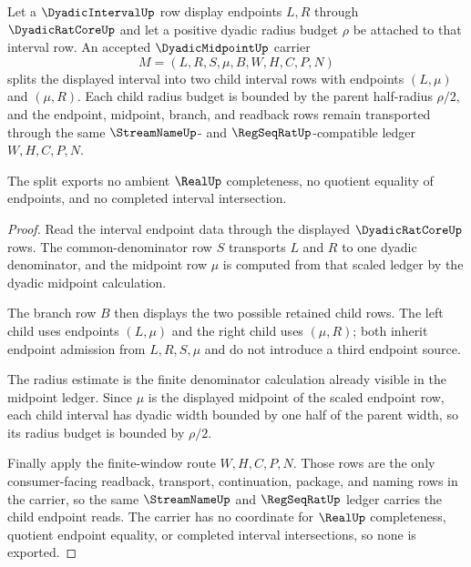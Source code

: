 \begin{theorem}
\label{thm:dyadic-midpoint-radius-halving-window}
Let a $\DyadicIntervalUp$ row display endpoints $L,R$ through $\DyadicRatCoreUp$ and let a positive dyadic radius budget $\rho$ be attached to that interval row. An accepted $\DyadicMidpointUp$ carrier
$$
M=(L,R,S,\mu,B,W,H,C,P,N)
$$
splits the displayed interval into two child interval rows with endpoints $(L,\mu)$ and $(\mu,R)$. Each child radius budget is bounded by the parent half-radius $\rho/2$, and the endpoint, midpoint, branch, and readback rows remain transported through the same $\StreamNameUp$- and $\RegSeqRatUp$-compatible ledger $W,H,C,P,N$.

The split exports no ambient $\RealUp$ completeness, no quotient equality of endpoints, and no completed interval intersection.
\end{theorem}
\begin{proof}
Read the interval endpoint data through the displayed $\DyadicRatCoreUp$ rows. The common-denominator row $S$ transports $L$ and $R$ to one dyadic denominator, and the midpoint row $\mu$ is computed from that scaled ledger by the dyadic midpoint calculation.

The branch row $B$ then displays the two possible retained child rows. The left child uses endpoints $(L,\mu)$ and the right child uses $(\mu,R)$; both inherit endpoint admission from $L,R,S,\mu$ and do not introduce a third endpoint source.

The radius estimate is the finite denominator calculation already visible in the midpoint ledger. Since $\mu$ is the displayed midpoint of the scaled endpoint row, each child interval has dyadic width bounded by one half of the parent width, so its radius budget is bounded by $\rho/2$.

Finally apply the finite-window route $W,H,C,P,N$. Those rows are the only consumer-facing readback, transport, continuation, package, and naming rows in the carrier, so the same $\StreamNameUp$ and $\RegSeqRatUp$ ledger carries the child endpoint reads. The carrier has no coordinate for $\RealUp$ completeness, quotient endpoint equality, or completed interval intersections, so none is exported.
\end{proof}

